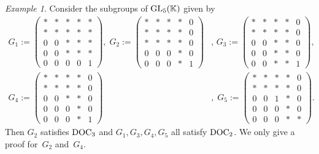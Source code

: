 \documentclass[a4paper,11pt,reqno]{amsart}
\numberwithin{equation}{section}
\theoremstyle{remark}
\newtheorem{example}[theorem]{Example}
\theoremstyle{definition}
\newcommand{\K}{\mathbb K}
\begin{document}
\begin{example}
\label{E5}
Consider the subgroups of ${\rm GL}_5(\K)$ given by
\begin{align*}
G_1:=\begin{pmatrix}
 *&*&*&*&*\\
 *&*&*&*&*\\
 0&0&*&*&*\\
 0&0&*&*&*\\
 0&0&0&0&1
 \end{pmatrix},\;
G_2:=\begin{pmatrix}
 *&*&*&*&0\\
 *&*&*&*&0\\
 *&*&*&*&0\\
 0&0&0&*&0\\
 0&0&0&*&1
 \end{pmatrix}&,\,
G_3:= \begin{pmatrix}
 *&*&*&*&0\\
 *&*&*&*&0\\
 0&0&*&*&0\\
 0&0&*&*&0\\
 0&0&*&*&1
 \end{pmatrix},\\
  G_4:=\begin{pmatrix}
 *&*&*&*&0\\
 *&*&*&*&0\\
 0&0&*&*&0\\
 0&0&0&*&0\\
 0&0&0&*&1
 \end{pmatrix}&,\;
G_5:= \begin{pmatrix}
 *&*&*&*&0\\
 *&*&*&*&0\\
 0&0&1&*&0\\
 0&0&0&*&0\\
 0&0&0&*&*
 \end{pmatrix}.
 \end{align*}
 Then $G_2$ satisfies  ${\rm DOC_3}$ and
 $G_1, G_3, G_4,G_5$  all satisfy    ${\rm DOC_2}$. We only give a proof for~$G_2$ and~$G_4$.


\end{example}
\end{document}
